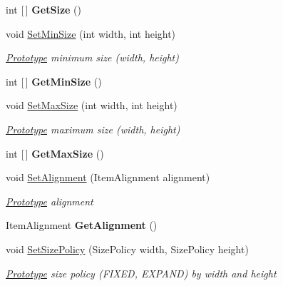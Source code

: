 \begin{DoxyCompactItemize}
int \mbox{[}$\,$\mbox{]} {\bfseries Get\+Size} ()
\item 
void \mbox{\hyperlink{class_space_v_i_l_1_1_prototype_a799cc25e25e57ca5b89d488a38cd8063}{Set\+Min\+Size}} (int width, int height)
\begin{DoxyCompactList}\small\item\em \mbox{\hyperlink{class_space_v_i_l_1_1_prototype}{Prototype}} minimum size (width, height) \end{DoxyCompactList}\item 
\mbox{\label{class_space_v_i_l_1_1_prototype_ab86d0c5ef75b87247099e3d37e5b6e97}} 
int \mbox{[}$\,$\mbox{]} {\bfseries Get\+Min\+Size} ()
\item 
void \mbox{\hyperlink{class_space_v_i_l_1_1_prototype_a9870d610d71b1dddfb2ca9e20243d6b5}{Set\+Max\+Size}} (int width, int height)
\begin{DoxyCompactList}\small\item\em \mbox{\hyperlink{class_space_v_i_l_1_1_prototype}{Prototype}} maximum size (width, height) \end{DoxyCompactList}\item 
\mbox{\label{class_space_v_i_l_1_1_prototype_a982dccc2f5344e94f1e74432d4af585a}} 
int \mbox{[}$\,$\mbox{]} {\bfseries Get\+Max\+Size} ()
\item 
void \mbox{\hyperlink{class_space_v_i_l_1_1_prototype_ac9d6f8cfbc2716ee740a8a21eaff33a8}{Set\+Alignment}} (Item\+Alignment alignment)
\begin{DoxyCompactList}\small\item\em \mbox{\hyperlink{class_space_v_i_l_1_1_prototype}{Prototype}} alignment \end{DoxyCompactList}\item 
\mbox{\label{class_space_v_i_l_1_1_prototype_ac5fd13994a1de3b2e874d7b56be26aee}} 
Item\+Alignment {\bfseries Get\+Alignment} ()
\item 
void \mbox{\hyperlink{class_space_v_i_l_1_1_prototype_aef3665193fee08b031ad7401dafc8674}{Set\+Size\+Policy}} (Size\+Policy width, Size\+Policy height)
\begin{DoxyCompactList}\small\item\em \mbox{\hyperlink{class_space_v_i_l_1_1_prototype}{Prototype}} size policy (F\+I\+X\+ED, E\+X\+P\+A\+ND) by width and height \end{DoxyCompactList}\item 

\end{DoxyCompactItemize}
